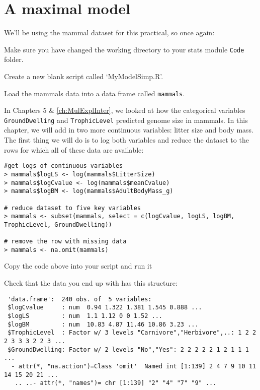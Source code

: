 \section{A maximal model}

We'll be using the mammal dataset for this practical, so once again:

\begin{compactitem}[$\quad\star$]
	\item Make sure you have changed the working directory to your 
	stats module {\tt Code} folder.
	\item Create a new blank script called `MyModelSimp.R'.
	\item Load the mammals data into a data frame called {\tt mammals}.
\end{compactitem}

In Chapters 5 \& \ref{ch:MulExplInter}, we looked at how the 
categorical variables {\tt GroundDwelling} and {\tt TrophicLevel} 
predicted genome size in mammals. In this chapter, we will add in two 
more continuous variables: litter size and body mass. The first thing 
we will do is to log both variables and reduce the dataset to the rows 
for which all of these data are available:

\begin{lstlisting}
#get logs of continuous variables
> mammals$logLS <- log(mammals$LitterSize)
> mammals$logCvalue <- log(mammals$meanCvalue)
> mammals$logBM <- log(mammals$AdultBodyMass_g)

# reduce dataset to five key variables
> mammals <- subset(mammals, select = c(logCvalue, logLS, logBM, 
TrophicLevel, GroundDwelling))

# remove the row with missing data
> mammals <- na.omit(mammals)
\end{lstlisting}

\begin{compactitem}[$\quad\star$]
	\item Copy the code above into your script and run it
	\item Check that the data you end up with has this structure:
\end{compactitem}

\begin{lstlisting}
 'data.frame':	240 obs. of  5 variables:
 $logCvalue     : num  0.94 1.322 1.381 1.545 0.888 ...
 $logLS         : num  1.1 1.12 0 0 1.52 ...
 $logBM         : num  10.83 4.87 11.46 10.86 3.23 ...
 $TrophicLevel  : Factor w/ 3 levels "Carnivore","Herbivore",..: 1 2 2 2 3 3 3 2 2 3 ...
 $GroundDwelling: Factor w/ 2 levels "No","Yes": 2 2 2 2 2 1 2 1 1 1 ...
  - attr(*, "na.action")=Class 'omit'  Named int [1:139] 2 4 7 9 10 11 14 15 20 21 ...
   .. ..- attr(*, "names")= chr [1:139] "2" "4" "7" "9" ...
\end{lstlisting}

